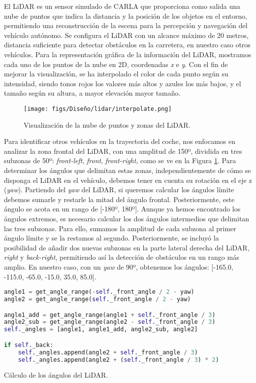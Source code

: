 El \ac{LiDAR} es un sensor simulado de CARLA que proporciona como salida una nube de puntos que indica la distancia y la posición de los objetos en el entorno, permitiendo una reconstrucción de la escena para la percepción y navegación del vehículo autónomo. Se configura el \ac{LiDAR} con un alcance máximo de 20 metros, distancia suficiente para detectar obstáculos en la carretera, en nuestro caso otros vehículos. Para la representación gráfica de la información del \ac{LiDAR}, mostramos cada uno de los puntos de la nube en 2D, coordenadas \textit{x} e \textit{y}. Con el fin de mejorar la visualización, se ha interpolado el color de cada punto según su intensidad, siendo tonos rojos los valores más altos y azules los más bajos, y el tamaño según su altura, a mayor elevación mayor tamaño.

\begin{figure}[ht]
\centering
\texttt{[image: figs/Diseño/lidar/interpolate.png]}
\caption{Visualización de la nube de puntos y zonas del \ac{LiDAR}.}
\label{fig:interpolate_lidar}
\end{figure}

Para identificar otros vehículos en la trayectoria del coche, nos enfocamos en analizar la zona frontal del \ac{LiDAR}, con una amplitud de 150º, dividida en tres subzonas de 50º: \textit{front-left}, \textit{front}, \textit{front-right}, como se ve en la Figura \ref{fig:interpolate_lidar}. Para determinar los ángulos que delimitan estas zonas, independientemente de cómo se disponga el \ac{LiDAR} en el vehículo, debemos tener en cuenta su rotación en el eje z (\textit{yaw}). Partiendo del \textit{yaw} del \ac{LiDAR}, si queremos calcular los ángulos límite debemos sumarle y restarle la mitad del ángulo frontal. Posteriormente, este ángulo se acota en un rango de [-180º, 180º]. Aunque ya hemos encontrado los ángulos extremos, es necesario calcular los dos ángulos intermedios que delimitan las tres subzonas. Para ello, sumamos la amplitud de cada subzona al primer ángulo límite y se la restamos al segundo. Posteriormente, se incluyó la posibilidad de añadir dos nuevas subzonas en la parte lateral derecha del \ac{LiDAR}, \textit{right} y \textit{back-right}, permitiendo así la detección de obstáculos en un rango más amplio. En nuestro caso, con un \textit{yaw} de 90º, obtenemos los ángulos: [-165.0, -115.0, -65.0, -15.0, 35.0, 85.0].

\begin{code}[h]
\begin{lstlisting}[language=Python]
angle1 = get_angle_range(-self._front_angle / 2 - yaw)
angle2 = get_angle_range(self._front_angle / 2 - yaw)

angle1_add = get_angle_range(angle1 + self._front_angle / 3)
angle2_sub = get_angle_range(angle2 - self._front_angle / 3)        
self._angles = [angle1, angle1_add, angle2_sub, angle2]

if self._back:
	self._angles.append(angle2 + self._front_angle / 3)
	self._angles.append(angle2 + (self._front_angle / 3) * 2)
\end{lstlisting}
\caption[Cálculo de los ángulos de la zona del \ac{LiDAR}]{Cálculo de los ángulos del \ac{LiDAR}.}
\label{cod:angle_lidar}
\end{code}

